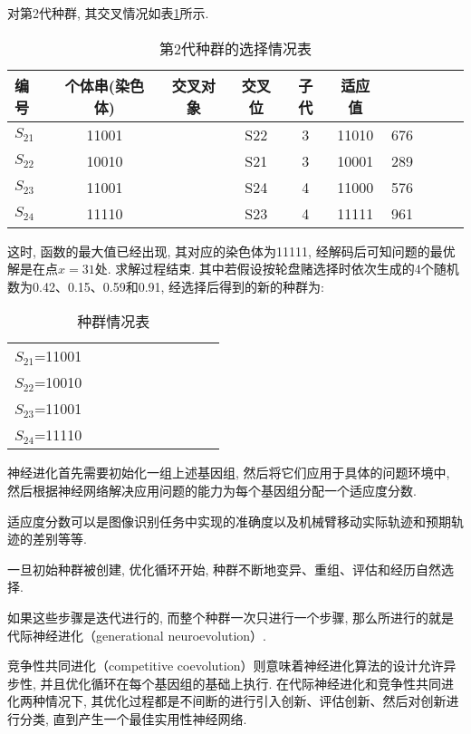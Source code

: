 {对第2代种群, 其交叉情况如表\ref{AI_table2019112810}所示.
\begin{table} [H]
\caption{第2代种群的选择情况表}
\begin{center}
\begin{tabular} {lccccccccc}
  \hline
编号&	个体串(染色体)&	交叉对象&	交叉位&子代&适应值\\
  \hline
$S_{21}$&	11001&	    &S22	&3	&11010&	676\\
$S_{22}$&	10010&	    &S21    &3	&10001&	289\\
$S_{23}$&	11001&	    &S24	&4	&11000&	576\\
$S_{24}$&	11110&	   & S23	&4	&11111&	961\\
\hline
\end{tabular}
\end{center}
\label{AI_table2019112810}
\end{table}
这时, 函数的最大值已经出现, 其对应的染色体为11111, 经解码后可知问题的最优解是在点$x=31$处. 求解过程结束.
其中若假设按轮盘赌选择时依次生成的4个随机数为0.42、0.15、0.59和0.91, 经选择后得到的新的种群为:
\begin{table} [H]
\caption{种群情况表}
\begin{center}
\begin{tabular} {lccccccccc}
\hline
$S_{21}$=11001\\
$S_{22}$=10010\\
$S_{23}$=11001\\
$S_{24}$=11110\\
\hline
\end{tabular}
\end{center}
\end{table}
\begin{remark}
神经进化首先需要初始化一组上述基因组, 然后将它们应用于具体的问题环境中, 然后根据神经网络解决应用问题的能力为每个基因组分配一个适应度分数.
\begin{newexam}
  适应度分数可以是图像识别任务中实现的准确度以及机械臂移动实际轨迹和预期轨迹的差别等等.
\end{newexam}

一旦初始种群被创建, 优化循环开始, 种群不断地变异、重组、评估和经历自然选择.

如果这些步骤是迭代进行的, 而整个种群一次只进行一个步骤, 那么所进行的就是代际神经进化（generational neuroevolution）.

竞争性共同进化（competitive coevolution）则意味着神经进化算法的设计允许异步性, 并且优化循环在每个基因组的基础上执行. 在代际神经进化和竞争性共同进化两种情况下, 其优化过程都是不间断的进行引入创新、评估创新、然后对创新进行分类, 直到产生一个最佳实用性神经网络.


\end{remark}}

